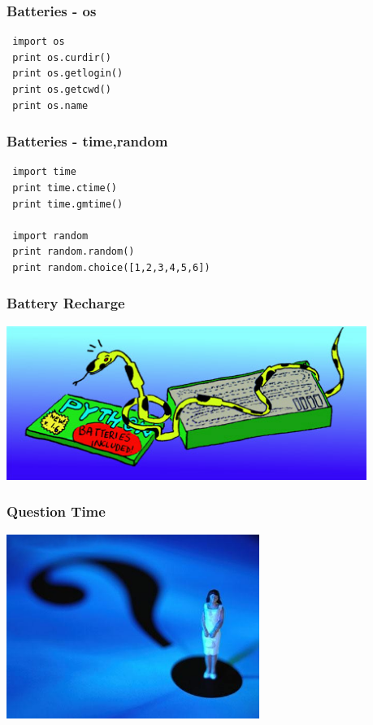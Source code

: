 \documentclass{beamer}
\begin{document}
\begin{frame}[fragile]
 \frametitle{Batteries - os}
\begin{verbatim}
 import os
 print os.curdir()
 print os.getlogin()
 print os.getcwd()
 print os.name
\end{verbatim}

\end{frame}

\begin{frame}[fragile]
 \frametitle{Batteries - time,random}
\begin{verbatim}
 import time
 print time.ctime()
 print time.gmtime()
 
 import random
 print random.random()
 print random.choice([1,2,3,4,5,6]) 
\end{verbatim}

\end{frame}

\begin{frame}
 \frametitle{Battery Recharge}
\begin{center}
 \includegraphics[height=5cm]{batt.jpg}
\end{center}

\end{frame}

\begin{frame}
 \frametitle{Question Time}
\begin{center}
 \includegraphics[height=6cm]{ques.jpg}
\end{center}

\end{frame}
\end{document}
